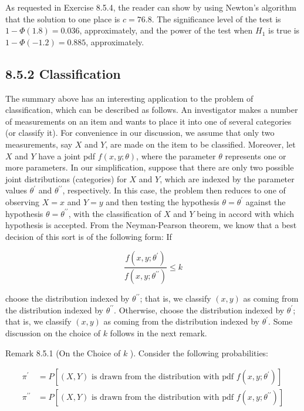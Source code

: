 As requested in Exercise 8.5.4, the reader can show by using Newton's algorithm that the solution to one place is $c=76.8$. The significance level of the test is $1-\Phi(1.8)=0.036$, approximately, and the power of the test when $H_{1}$ is true is $1-\Phi(-1.2)=0.885$, approximately.

\subsection*{8.5.2 Classification}
The summary above has an interesting application to the problem of classification, which can be described as follows. An investigator makes a number of measurements on an item and wants to place it into one of several categories (or classify it). For convenience in our discussion, we assume that only two measurements, say $X$ and $Y$, are made on the item to be classified. Moreover, let $X$ and $Y$ have a joint pdf $f(x, y ; \theta)$, where the parameter $\theta$ represents one or more parameters. In our simplification, suppose that there are only two possible joint distributions (categories) for $X$ and $Y$, which are indexed by the parameter values $\theta^{\prime}$ and $\theta^{\prime \prime}$, respectively. In this case, the problem then reduces to one of observing $X=x$ and $Y=y$ and then testing the hypothesis $\theta=\theta^{\prime}$ against the hypothesis $\theta=\theta^{\prime \prime}$, with the classification of $X$ and $Y$ being in accord with which hypothesis is accepted. From the Neyman-Pearson theorem, we know that a best decision of this sort is of the following form: If

$$
\frac{f\left(x, y ; \theta^{\prime}\right)}{f\left(x, y ; \theta^{\prime \prime}\right)} \leq k
$$

choose the distribution indexed by $\theta^{\prime \prime}$; that is, we classify $(x, y)$ as coming from the distribution indexed by $\theta^{\prime \prime}$. Otherwise, choose the distribution indexed by $\theta^{\prime}$; that is, we classify $(x, y)$ as coming from the distribution indexed by $\theta^{\prime}$. Some discussion on the choice of $k$ follows in the next remark.

Remark 8.5.1 (On the Choice of $k$ ). Consider the following probabilities:

$$
\begin{aligned}
\pi^{\prime} & =P\left[(X, Y) \text { is drawn from the distribution with pdf } f\left(x, y ; \theta^{\prime}\right)\right] \\
\pi^{\prime \prime} & =P\left[(X, Y) \text { is drawn from the distribution with pdf } f\left(x, y ; \theta^{\prime \prime}\right)\right]
\end{aligned}
$$

